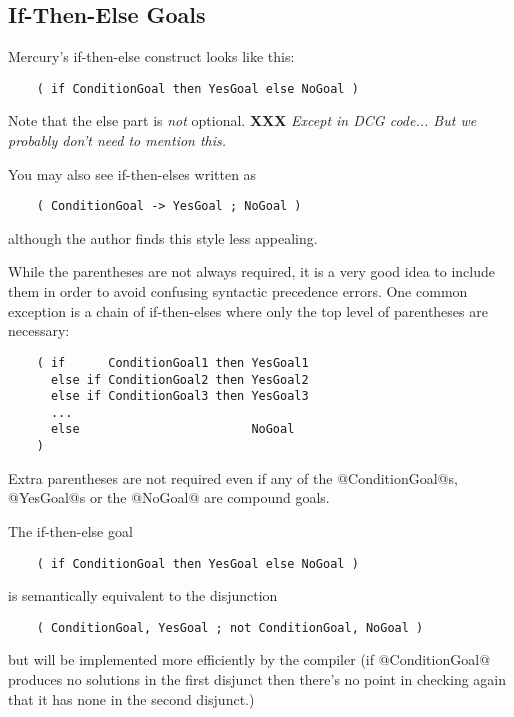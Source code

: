 \documentclass[a4paper,11pt,notitlepage,onecolumn]{article}
\newcommand{\XXX}[1]%
{{\small\textbf{XXX} \emph{#1}}}
\begin{document}
\subsection{If-Then-Else Goals}

Mercury's if-then-else construct looks like this:
\begin{verbatim}
    ( if ConditionGoal then YesGoal else NoGoal )
\end{verbatim}
Note that the else part is \emph{not} optional.  \XXX{Except in DCG
code...  But we probably don't need to mention this.}

You may also see if-then-elses written as
\begin{verbatim}
    ( ConditionGoal -> YesGoal ; NoGoal )
\end{verbatim}
although the author finds this style less appealing.

While the parentheses are not always required, it is a very
good idea to include them in order to avoid confusing
syntactic precedence errors.  One common exception is a chain
of if-then-elses where only the top level of parentheses are
necessary:
\begin{verbatim}
    ( if      ConditionGoal1 then YesGoal1
      else if ConditionGoal2 then YesGoal2
      else if ConditionGoal3 then YesGoal3
      ...
      else                        NoGoal
    )
\end{verbatim}
Extra parentheses are not required even if any of the @ConditionGoal@s,
@YesGoal@s or the @NoGoal@ are compound goals.

The if-then-else goal
\begin{verbatim}
    ( if ConditionGoal then YesGoal else NoGoal )
\end{verbatim}
is semantically equivalent to the disjunction
\begin{verbatim}
    ( ConditionGoal, YesGoal ; not ConditionGoal, NoGoal )
\end{verbatim}
but will be implemented more efficiently by the compiler (if
@ConditionGoal@ produces no solutions in the first disjunct then
there's no point in checking again that it has none in the
second disjunct.)
\end{document}
